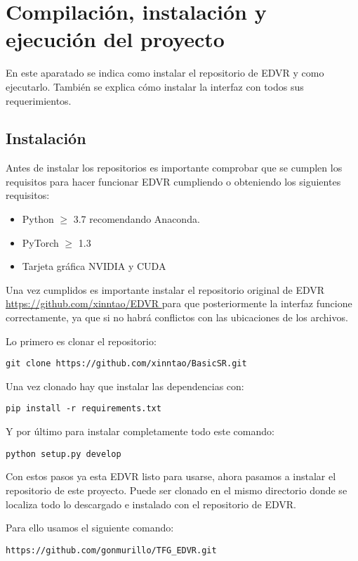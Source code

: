 \section{Compilación, instalación y ejecución del proyecto}
En este aparatado se indica como instalar el repositorio de EDVR y como ejecutarlo. También se explica cómo instalar la interfaz con todos sus requerimientos.

\subsection{Instalación}
\label{sub:ins}
Antes de instalar los repositorios es importante comprobar que se cumplen los requisitos para hacer funcionar EDVR cumpliendo o obteniendo los siguientes requisitos:

\begin{itemize}
	\item Python $\geq$ 3.7 recomendando Anaconda.
	\item PyTorch $\geq$ 1.3
	\item Tarjeta gráfica NVIDIA y CUDA
\end{itemize}

Una vez cumplidos es importante instalar el repositorio original de EDVR  \url{ https://github.com/xinntao/EDVR } para que posteriormente la interfaz funcione correctamente, ya que si no habrá conflictos con las ubicaciones de los archivos.

Lo primero es clonar el repositorio:
\begin{verbatim}
git clone https://github.com/xinntao/BasicSR.git
\end{verbatim}

Una vez clonado hay que instalar las dependencias con: 
\begin{verbatim}
pip install -r requirements.txt
\end{verbatim}

Y por último para instalar completamente todo este comando:
\begin{verbatim}
python setup.py develop
\end{verbatim}

Con estos pasos ya esta EDVR listo para usarse, ahora pasamos a instalar el repositorio de este proyecto. Puede ser clonado en el mismo directorio donde se localiza todo lo descargado e instalado con el repositorio de EDVR.

Para ello usamos el siguiente comando:
\begin{verbatim}
https://github.com/gonmurillo/TFG_EDVR.git
\end{verbatim}

